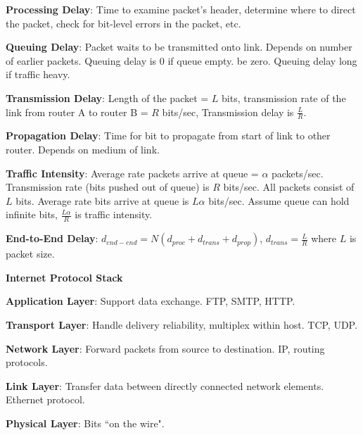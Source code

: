\documentclass{scrartcl}
\begin{document}
\raggedright
\begin{multicols*}{3}


{\bf Processing Delay}: Time to examine packet's header, determine where to direct the packet, check for bit-level errors in the packet, etc.

{\bf Queuing Delay}: Packet waits to be transmitted onto link. Depends on number of earlier packets. Queuing delay is 0 if queue empty. be zero. Queuing delay long if traffic heavy.

{\bf Transmission Delay}: Length of the packet = $L$ bits, transmission rate of the link from router A to router B = $R$ bits/sec, Transmission delay is $\frac{L}{R}$.

{\bf Propagation Delay}: Time for bit to propagate from start of link to other router. Depends on medium of link.

{\bf Traffic Intensity}: Average rate packets arrive at queue = $\alpha$ packets/sec. Transmission rate (bits pushed out of queue) is $R$ bits/sec. All packets consist of $L$ bits. Average rate bits arrive at queue is $L\alpha$ bits/sec. Assume queue can hold infinite bits, $\frac{L\alpha}{R}$ is traffic intensity.

{\bf End-to-End Delay}: $d_{end-end} = N(d_{proc}+d_{trans}+d_{prop})$, $d_{trans}=\frac{L}{R}$ where $L$ is packet size.

{\bf Internet Protocol Stack}

{\bf Application Layer}: Support data exchange. FTP, SMTP, HTTP.

{\bf Transport Layer}: Handle delivery reliability, multiplex within host. TCP, UDP.

{\bf Network Layer}: Forward packets from source to destination. IP, routing protocols.

{\bf Link Layer}: Transfer data between directly connected network elements. Ethernet protocol.

{\bf Physical Layer}: Bits ``on the wire".


\end{multicols*}
\end{document}
